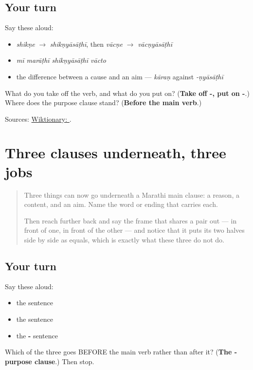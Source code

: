 \subsection*{Your turn}
Say these aloud:

\begin{itemize}
\raggedright
  \item \emph{shikṇe} $\to$ \emph{shikṇyāsāṭhī}, then \emph{vācṇe} $\to$ \emph{vācṇyāsāṭhī}
  \item \emph{mī marāṭhī shikṇyāsāṭhī vācto}
  \item the difference between a cause and an aim — \emph{kāraṇ} against \emph{-ṇyāsāṭhī}
\end{itemize}

\begin{tcolorbox}[breakable,colback=teal!4,colframe=teal!35!black,title={Before you move on}]
What do you take off the verb, and what do you put on? (\textbf{Take off -, put on -}.) Where does the purpose clause stand? (\textbf{Before the main verb}.)

Sources: \href{https://en.wiktionary.org/wiki/\%E0\%A4\%B8\%E0\%A4\%BE\%E0\%A4\%A0\%E0\%A5\%80}{Wiktionary: }.
\end{tcolorbox}
\section[\texorpdfstring{… \mr{की} … … (… kī … …)}{… की … … (… kī … …)}]{Three clauses underneath, three jobs}

\label{lesson:MR-R35-inside}



\begin{quote}
Three things can now go underneath a Marathi main clause: a reason, a content, and an aim. Name the word or ending that carries each.

Then reach further back and say the frame that shares a pair out — \textbf{} in front of one, \textbf{} in front of the other — and notice that it puts its two halves side by side as equals, which is exactly what these three do not do.
\end{quote}

\subsection*{Your turn}
Say these aloud:

\begin{itemize}
\raggedright
  \item the \textbf{} sentence
  \item the \textbf{} sentence
  \item the \textbf{-} sentence
\end{itemize}

\begin{tcolorbox}[breakable,colback=teal!4,colframe=teal!35!black,title={Before you move on}]
Which of the three goes BEFORE the main verb rather than after it? (\textbf{The - purpose clause}.) Then stop.
\end{tcolorbox}
